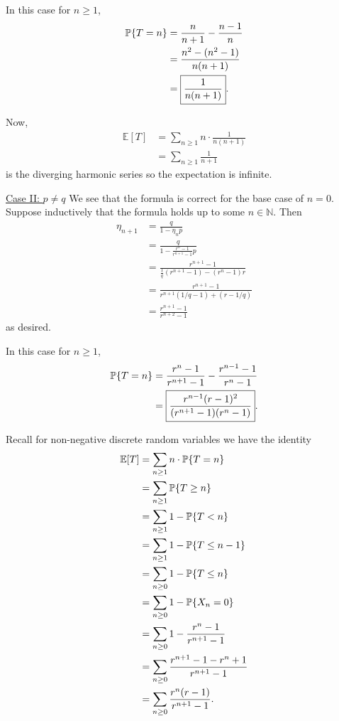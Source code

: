 \documentclass[10pt]{article}
\DeclarePairedDelimiter{\set}{\lbrace}{\rbrace}
\newcommand{\E}{\mathbb{E}}
\newcommand{\N}{\mathbb{N}}
\renewcommand{\P}{\mathbb{P}}
\begin{document}
In this case for $n\geq 1$,
\begin{align*}
  \P\set{T=n}
  &= \frac{n}{n+1} - \frac{n-1}{n} \\
  &= \frac{n^2 - (n^2-1)}{n(n+1)} \\
  &= \boxed{\frac{1}{n(n+1)}}. 
\end{align*}

Now,
\begin{align*}
  \E[T]
  &= \sum_{n\geq 1} n\cdot \frac1{n(n+1)} \\
  &= \sum_{n\geq 1} \frac1{n+1}
\end{align*}
is the diverging harmonic series so the expectation is infinite.

\underline{Case II: $p\neq q$}
We see that the formula is correct for the base case of $n=0$.
Suppose inductively that the formula holds up to some $n\in \N$.
Then
\begin{align*}
  \eta_{n+1}
  &= \frac{q}{1-\eta_n p} \\
  &= \frac{q}{1- \frac{r^n-1}{r^{n+1}-1} p} \\
  &= \frac{r^{n+1}-1}{\frac1q (r^{n+1}-1) - (r^n-1)r} \\
  &= \frac{r^{n+1}-1}{r^{n+1} (1/q-1) + (r-1/q)} \\
  &= \frac{r^{n+1}-1}{r^{n+2}-1}
\end{align*}
as desired.

In this case for $n\geq 1$,
\begin{align*}
  \P\set{T=n}
  &= \frac{r^n-1}{r^{n+1}-1} - \frac{r^{n-1}-1}{r^{n}-1} \\
  &= \boxed{\frac{r^{n-1} (r-1)^2}{(r^{n+1}-1)(r^n-1)}}.
\end{align*}

Recall for non-negative discrete random variables
we have the identity
\begin{align*}
  \E[T]
  &= \sum_{n\geq 1} n\cdot \P\set{T=n} \\
  &= \sum_{n\geq 1} \P\set{T\geq n} \\
  &= \sum_{n\geq 1} 1- \P\set{T<n} \\
  &= \sum_{n\geq 1} 1- \P\set{T\leq n-1} \\
  &= \sum_{n\geq 0} 1- \P\set{T\leq n} \\
  &= \sum_{n\geq 0} 1- \P\set{X_n = 0} \\
  &= \sum_{n\geq 0} 1 - \frac{r^{n} - 1}{r^{n+1}-1} \\
  &= \sum_{n\geq 0} \frac{r^{n+1} - 1 - r^{n} + 1}{r^{n+1}-1} \\
  &= \sum_{n\geq 0} \frac{r^n(r - 1)}{r^{n+1}-1}.
\end{align*}
\end{document}
